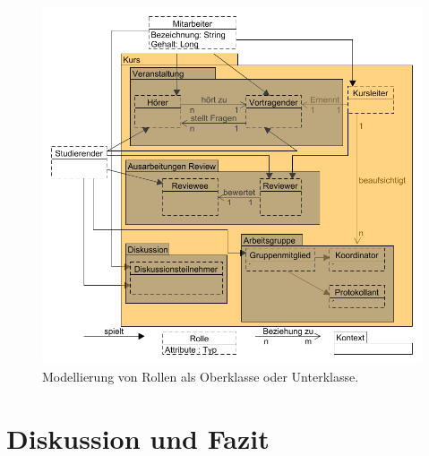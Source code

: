 \documentclass[conference]{IEEEtran}
\begin{document}
\begin{figure}
\includegraphics[scale=0.3]{Images/collabLearningContexts.PNG}
\caption{Modellierung von Rollen als Oberklasse oder Unterklasse.}
\end{figure}

\section{Diskussion und Fazit}

{}



\end{document}
